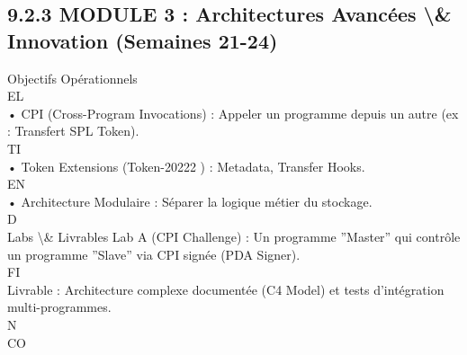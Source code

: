\subsection{9.2.3 MODULE 3 : Architectures Avancées \textbackslash{}& Innovation (Semaines 21-24)}
Objectifs Opérationnels\\
\vspace{0.5em}
\vspace{0.5em}
\vspace{0.5em}
\vspace{0.5em}
EL\\
• CPI (Cross-Program Invocations) : Appeler un programme depuis un autre (ex : Transfert SPL Token).\\
\vspace{0.5em}
\vspace{0.5em}
\vspace{0.5em}
\vspace{0.5em}
TI\\
• Token Extensions (Token-20222 ) : Metadata, Transfer Hooks.\\
\vspace{0.5em}
\vspace{0.5em}
\vspace{0.5em}
\vspace{0.5em}
EN\\
• Architecture Modulaire : Séparer la logique métier du stockage.\\
\vspace{0.5em}
\vspace{0.5em}
\vspace{0.5em}
\vspace{0.5em}
D\\
Labs \textbackslash{}& Livrables Lab A (CPI Challenge) : Un programme ”Master” qui contrôle un programme ”Slave” via CPI signée (PDA Signer).\\
\vspace{0.5em}
\vspace{0.5em}
\vspace{0.5em}
\vspace{0.5em}
FI\\
Livrable : Architecture complexe documentée (C4 Model) et tests d’intégration multi-programmes.\\
\vspace{0.5em}
N\\
CO\\

